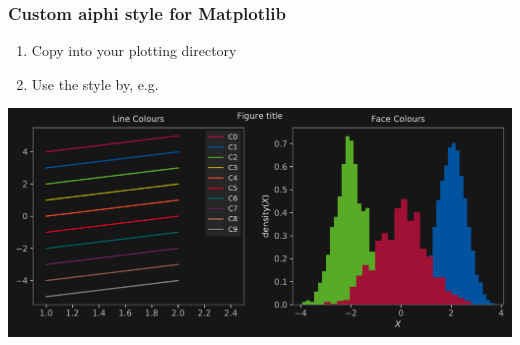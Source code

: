 \documentclass[mathserif, fleqn, aspectratio=169]{beamer}
\begin{document}
\begin{frame}\frametitle{Custom aiphi style for Matplotlib}
  \begin{center}
    \begin{enumerate}
    \item Copy  into your plotting directory
    \item Use the style by, e.g.\ 
    \end{enumerate}
    \vfill
    \includegraphics[height=0.6\paperheight]{extra/plots.pdf}
    \vspace{-1.5em}
  \end{center}
\end{frame}

%         
\end{document}
